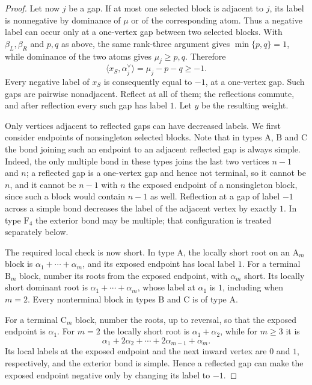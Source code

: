 \documentclass[11pt]{article}
\theoremstyle{definition}
\theoremstyle{remark}
\newcommand{\typeA}{\ensuremath{\mathrm{A}}}
\newcommand{\typeB}{\ensuremath{\mathrm{B}}}
\newcommand{\typeC}{\ensuremath{\mathrm{C}}}
\newcommand{\typeF}{\ensuremath{\mathrm{F}}}
\begin{document}
\begin{proof}
Let now $j$ be a gap.  If at most one selected block is adjacent to $j$, its
label is nonnegative by dominance of $\mu$ or of the corresponding atom.
Thus a negative label can occur only at a one-vertex gap between two selected
blocks.  With $\beta_L,\beta_R$ and $p,q$ as above, the same rank-three
argument gives $\min\{p,q\}=1$, while dominance of the two atoms gives
$\mu_j\ge p,q$.  Therefore
\begin{equation}\label{eq:path-gap-minus-one}
 \langle x_S,\alpha_j^\vee\rangle
       =\mu_j-p-q\ge-1.
\end{equation}
Every negative label of $x_S$ is consequently equal to $-1$, at a one-vertex
gap.  Such gaps are pairwise nonadjacent.  Reflect at all of them; the
reflections commute, and after reflection every such gap has label $1$.  Let
$y$ be the resulting weight.

Only vertices adjacent to reflected gaps can have decreased labels.  We first
consider endpoints of nonsingleton selected blocks.  Note that in types
$\typeA$, $\typeB$ and $\typeC$ the bond joining such an endpoint to an
adjacent reflected gap is always simple.  Indeed, the only multiple bond in
these types joins the last two vertices $n-1$ and $n$; a reflected gap is a
one-vertex gap and hence not terminal, so it cannot be $n$, and it cannot be
$n-1$ with $n$ the exposed endpoint of a nonsingleton block, since such a
block would contain $n-1$ as well.  Reflection at a gap of label $-1$ across a
simple bond decreases the label of the adjacent vertex by exactly $1$.  In
type $\typeF_4$ the exterior bond may be multiple; that configuration is
treated separately below.

The required local check is now short.  In type $\typeA$, the locally short
root on an $\typeA_m$ block is $\alpha_1+\cdots+\alpha_m$, and its exposed endpoint
has local label $1$.  For a terminal $\typeB_m$ block, number its roots from
the exposed endpoint, with $\alpha_m$ short.  Its locally short dominant root
is $\alpha_1+\cdots+\alpha_m$, whose label at $\alpha_1$ is $1$, including
when $m=2$.  Every
nonterminal block in types $\typeB$ and $\typeC$ is of type $\typeA$.

For a terminal $\typeC_m$ block, number the roots, up to reversal, so that the
exposed endpoint is $\alpha_1$.  For $m=2$ the locally short root is
$\alpha_1+\alpha_2$, while for $m\ge3$ it is
\[
 \alpha_1+2\alpha_2+\cdots+2\alpha_{m-1}+\alpha_m.
\]
Its local labels at the exposed endpoint and the next inward vertex are $0$
and $1$, respectively, and the exterior bond is simple.  Hence a reflected
gap can make the exposed endpoint negative only by changing its label to
$-1$.


\end{proof}
\end{document}
